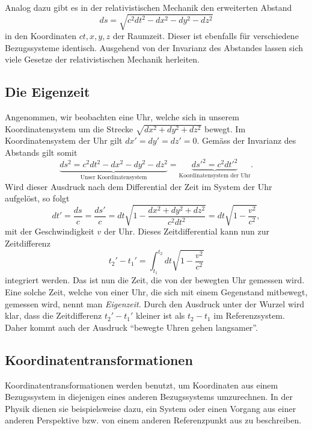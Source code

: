 Analog dazu gibt es in der relativistischen Mechanik den erweiterten Abstand
\begin{equation}
    ds = \sqrt{c^2dt^2 - dx^2 - dy^2 - dz^2}
    \label{relativ:eqn:abstand-relativ}
\end{equation}
in den Koordinaten \(ct, x, y, z\) der Raumzeit.
Dieser ist ebenfalls für verschiedene Bezugssysteme identisch.
Ausgehend von der Invarianz des Abstandes lassen sich
viele Gesetze der relativistischen Mechanik herleiten.


\subsection{Die Eigenzeit 
\label{relativ:section:eigenzeit}}
Angenommen, wir beobachten eine Uhr,
welche sich in unserem Koordinatensystem um die Strecke
\(\sqrt{dx^2 + dy^2 + dz^2}\)
bewegt.
Im Koordinatensystem der Uhr gilt
\(dx' = dy' = dz' = 0\).
Gemäss der Invarianz des Abstands gilt somit
\begin{equation*}
    \underbrace{ds^2 = c^2 dt^2 - dx^2 - dy^2 - dz^2}_{\text{Unser Koordinatensystem}}
        = \underbrace{ds'^2 = c^2 dt'^2}_{\text{Koordinatensystem der Uhr}} .
\end{equation*}
Wird dieser Ausdruck nach dem Differential der Zeit im System der Uhr aufgelöst,
so folgt
\begin{equation}
    dt' = \frac{ds}{c} = \frac{ds'}{c}
    = dt \sqrt{1 - \frac{dx^2+dy^2+dz^2}{c^2 dt^2}}
    = dt \sqrt{1 - \frac{v^2}{c^2}},
    \label{relativ:eqn:differential-eigenzeit}
\end{equation}
mit der Geschwindigkeit \(v\) der Uhr.
Dieses Zeitdifferential kann nun zur Zeitdifferenz
\begin{equation}
    t_2' - t_1' = \int_{t_1}^{t_2} dt \sqrt{1 - \frac{v^2}{c^2}}
    \label{relativ:eqn:eigenzeit}
\end{equation}
integriert werden.
Das ist nun die Zeit, die von der bewegten Uhr gemessen wird.
Eine solche Zeit, welche von einer Uhr,
die sich mit einem Gegenstand mitbewegt, gemessen wird,
nennt man \emph{Eigenzeit}.
%
Durch den Ausdruck unter der Wurzel wird klar,
dass die Zeitdifferenz \(t_2'- t_1'\) kleiner ist
als \(t_2 - t_1\) im Referenzsystem.
Daher kommt auch der Ausdruck
``bewegte Uhren gehen langsamer''.
%

\subsection{Koordinatentransformationen 
\label{relativ:section:koordtrafo}}
Koordinatentransformationen werden benutzt,
um Koordinaten aus einem Bezugssystem in diejenigen eines anderen Bezugssystems umzurechnen.
In der Physik dienen sie beispielsweise dazu,
ein System oder einen Vorgang aus einer anderen Perspektive bzw.
von einem anderen Referenzpunkt aus zu beschreiben.

